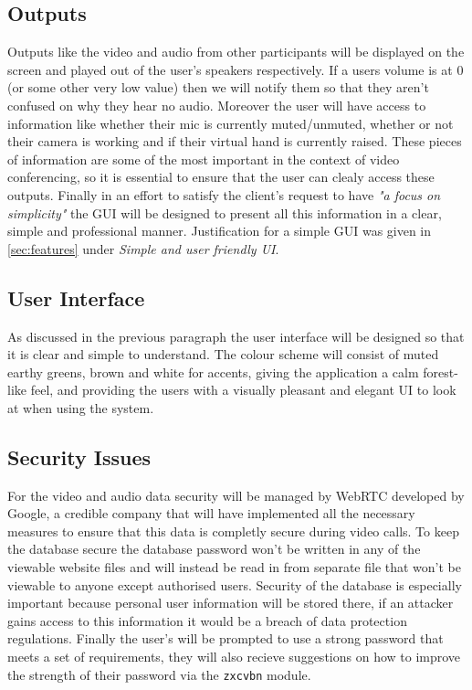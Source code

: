 \subsection{Outputs}

Outputs like the video and audio from other participants will 
be displayed on the screen and played out of the user's 
speakers respectively. If a users volume is at 0 (or some 
other very low value) then we will 
notify them so that they aren't confused on why they hear no 
audio. Moreover the user will have access to 
information like whether their mic is currently muted/unmuted,
whether or not their camera is working and if their virtual 
hand is currently raised. These pieces of information are
some of the most important in the context of video
conferencing, so it is essential to ensure that the user can 
clealy access these outputs. Finally in an effort to satisfy
the client's request to have \textit{"a focus on simplicity"}
the GUI will be designed to present all this information in a
clear, simple and professional manner. Justification for a
simple GUI was given in \ref{sec:features} under 
\textit{Simple and user friendly UI}.

\subsection{User Interface}

As discussed in the previous paragraph the user interface will
be designed so that it is clear and simple to understand. The 
colour scheme will consist of muted earthy greens, brown and
white for accents, giving the application a calm forest-like 
feel, and providing the users with a visually pleasant and 
elegant UI to look at when using the system.

\subsection{Security Issues}

For the video and audio data security will be managed by 
WebRTC developed by Google, a credible company that will have
implemented all the necessary measures to ensure that this
data is completly secure during video calls. To keep the 
database secure the database password won't be written in any
of the viewable website files and will instead be read in from
separate file that won't be viewable to anyone except 
authorised users. Security of the database is especially 
important because personal user information will be stored 
there, if an attacker gains access to this information it 
would be a breach of data protection regulations. Finally 
the user's will be prompted to use a strong password that 
meets a set of requirements, they will also recieve 
suggestions on how to improve the strength of their password
via the \texttt{zxcvbn} module.

